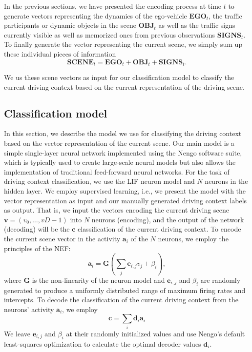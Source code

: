 In the previous sections, we have presented the encoding process at time $t$ to generate vectors representing the dynamics of the ego-vehicle $ \mathbf{EGO}_{t}$, the traffic participants or dynamic objects in the scene $ \mathbf{OBJ}_{t}$ as well as the traffic signs currently visible as well as memorized ones from previous observations $ \mathbf{SIGNS}_{t}$.
To finally generate the vector representing the current scene, we simply sum up these individual pieces of information
\begin{equation}
\label{eq:context_class_scene_vec}
\mathbf{SCENE}_{t} = \mathbf{EGO}_t + \mathbf{OBJ}_t + \mathbf{SIGNS}_t.
\end{equation}

We us these scene vectors as input for our classification model to classify the current driving context based on the current representation of the driving scene.

\subsection{Classification model}%
\label{subsec:classification_model}

In this section, we describe the model we use for classifying the driving context based on the vector representation of the current scene.
Our main model is a simple single-layer neural network implemented using the \ac{Nengo} \cite{Bekolay2014} software suite, which is typically used to create large-scale neural models \cite{Eliasmith2013} but also allows the implementation of traditional feed-forward neural networks.
For the task of driving context classification, we use the \ac{LIF} neuron model and $N$ neurons in the hidden layer.
We employ supervised learning, i.e., we present the model with the vector representation as input and our manually generated driving context labels as output.
That is, we input the vectors encoding the current driving scene $\mathbf{v} = \left(v_{0}, \ldots, v{D-1}\right)$ into $N$ neurons (encoding), and the output of the network (decoding) will be the $\mathbf{c}$ classification of the current driving context.
To encode the current scene vector in the activity $ \mathbf{a}_{i}$ of the $N$ neurons, we employ the principles of the \ac{NEF}:
\begin{equation}
  \mathbf{a}_{i} = \mathbf{G} \left(\sum_{j} \mathbf{e}_{i,j} v_j+\beta_i\right),
  \label{eq:context_class_encoding}
\end{equation}
where $ \mathbf{G}$ is the non-linearity of the neuron model and $\mathbf{e}_{i,j}$ and $\beta_i$ are randomly generated to produce a uniformly distributed range of maximum firing rates and intercepts.
To decode the classification of the current driving context from the neurons' activity $ \mathbf{a}_{i}$, we employ
\begin{equation}
  \mathbf{c} = \sum_{i} \mathbf{d}_{i}\mathbf{a}_i
  \label{eq:context_class_decoding}
\end{equation}
We leave $\mathbf{e}_{i,j}$ and $\beta_i$ at their randomly initialized values and use \ac{Nengo}'s default least-squares optimization to calculate the optimal decoder values $ \mathbf{d}_{i}$.

